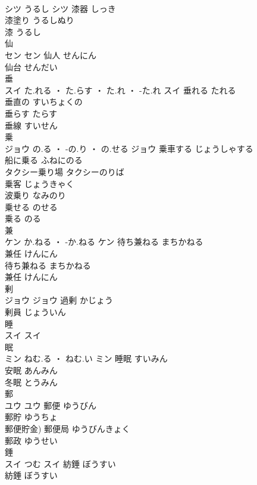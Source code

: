 \documentclass[8pt]{extreport}
\begin{document}
\begin{CJK}{UTF8}{min}
\\	シツ	うるし	シツ	漆器	しっき	
\\	漆塗り	うるしぬり	
\\	漆	うるし	
\\	仙	
\\	セン		セン	仙人	せんにん	
\\	仙台	せんだい	
\\	垂	
\\	スイ	た.れる ・ た.らす ・ た.れ ・ -た.れ	スイ	垂れる	たれる	
\\	垂直の	すいちょくの	
\\	垂らす	たらす	
\\	垂線	すいせん	
\\	乗	
\\	ジョウ	の.る ・ -の.り ・ の.せる	ジョウ	乗車する	じょうしゃする	
\\	船に乗る	ふねにのる	
\\	タクシー乗り場	タクシーのりば	
\\	乗客	じょうきゃく	
\\	波乗り	なみのり	
\\	乗せる	のせる	
\\	乗る	のる	
\\	兼	
\\	ケン	か.ねる ・ -か.ねる	ケン	待ち兼ねる	まちかねる	
\\	兼任	けんにん	
\\	待ち兼ねる	まちかねる	
\\	兼任	けんにん	
\\	剰	
\\	ジョウ		ジョウ	過剰	かじょう	
\\	剰員	じょういん	
\\	睡	
\\	スイ		スイ																																			
\\	眠	
\\	ミン	ねむ.る ・ ねむ.い	ミン	睡眠	すいみん	
\\	安眠	あんみん	
\\	冬眠	とうみん	
\\	郵	
\\	ユウ		ユウ	郵便	ゆうびん	
\\	郵貯	ゆうちょ	
\\	郵便貯金)	郵便局	ゆうびんきょく	
\\	郵政	ゆうせい	
\\	錘	
\\	スイ	つむ	スイ	紡錘	ぼうすい	
\\	紡錘	ぼうすい	

\end{CJK}
\end{document}
